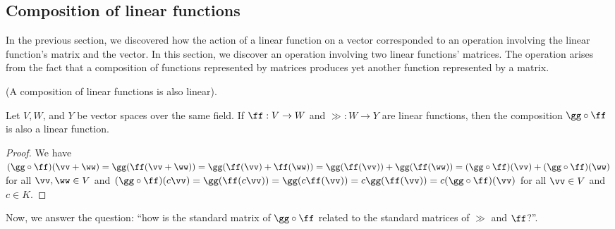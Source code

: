 \subsection*{Composition of linear functions}

In the previous section, we discovered how the action of a linear function on a vector corresponded to an operation involving the linear function's matrix and the vector. In this section, we discover an operation involving two linear functions' matrices. The operation arises from the fact that a composition of functions represented by matrices produces yet another function represented by a matrix.

\begin{theorem}
    (A composition of linear functions is also linear).
    
    Let $V, W$, and $Y$ be vector spaces over the same field. If $\ff:V \rightarrow W$ and $\gg:W \rightarrow Y$ are linear functions, then the composition $\gg \circ \ff$ is also a linear function.
\end{theorem}

\begin{proof}
   We have $(\gg \circ \ff)(\vv + \ww) = \gg(\ff(\vv + \ww)) = \gg(\ff(\vv) + \ff(\ww)) = \gg(\ff(\vv)) + \gg(\ff(\ww)) = (\gg \circ \ff)(\vv) + (\gg \circ \ff)(\ww)$ for all $\vv, \ww \in V$ and $(\gg \circ \ff)(c\vv) = \gg(\ff(c\vv)) = \gg(c\ff(\vv)) = c\gg(\ff(\vv)) = c (\gg \circ \ff)(\vv)$ for all $\vv \in V$ and $c \in K$.
\end{proof}

Now, we answer the question: ``how is the standard matrix of $\gg \circ \ff$ related to the standard matrices of $\gg$ and $\ff$?''.

